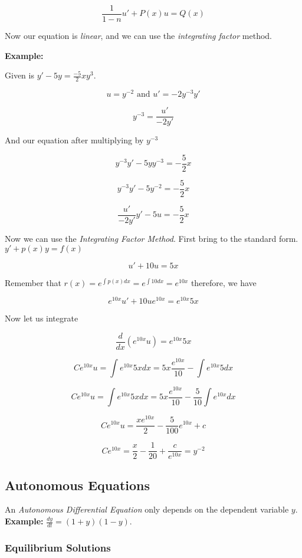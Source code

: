 \[
    \frac{1}{1 - n}u' + P(x)u = Q(x)
\]

Now our equation is \emph{linear}, and we can use the \emph{integrating factor} method.

\textbf{Example: }

Given is \(y' -5y = \frac{-5}{2}xy^3\).

\[
    u = y^{-2}  \text{ and } u' = -2y^{-3}y'
\]

\[
    y^{-3} = \frac{u'}{-2y'}
\]

And our equation after multiplying by \(y^{-3}\)

\[
    y^{-3}y' - 5yy^{-3} = -\frac{5}{2}x 
\]

\[
    y^{-3}y' - 5y^{-2} = -\frac{5}{2}x 
\]

\[
    \frac{u'}{-2y'}y' - 5u = -\frac{5}{2}x 
\]

Now we can use the \emph{Integrating Factor Method}. First bring to the standard form.
\(y' + p(x)y = f(x)\)

\[
  u' + 10u = 5x 
\]

Remember that \(r(x) = e^{\int p(x)dx} = e^{\int 10 dx} = e^{10x}\) therefore, we have

\[
    e^{10x}u' + 10ue^{10x} = e^{10x}5x
\]

Now let us integrate

\[
    \frac{d}{dx} \left(e^{10x}u\right) = e^{10x}5x
\]

\[
    Ce^{10x}u = \int e^{10x} 5x dx = 5x \frac{e^{10x}}{10} - \int e^{10x}5dx
\]

\[
    Ce^{10x}u = \int e^{10x} 5x dx = 5x \frac{e^{10x}}{10} - \frac{5}{10}\int e^{10x}dx
\]

\[
    Ce^{10x}u = \frac{xe^{10x}}{2} - \frac{5}{100} e^{10x} + c
\]

\[
    Ce^{10x} = \frac{x}{2} - \frac{1}{20} + \frac{c}{e^{10x}} = y^{-2}
\]

\subsection{Autonomous Equations}

An \emph{Autonomous Differential Equation} only depends on the dependent
variable \(y\).\textbf{ Example: } \(\frac{dy}{dt} = (1 + y)(1 -y)\).

\subsubsection{Equilibrium Solutions}

